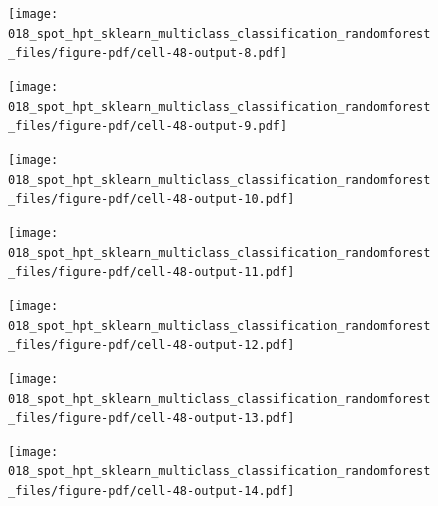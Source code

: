 \documentclass[
  letterpaper,
  DIV=11,
  numbers=noendperiod]{scrreprt}
\begin{document}
\begin{figure}[H]

{\centering \texttt{[image: 018\_spot\_hpt\_sklearn\_multiclass\_classification\_randomforest\_files/figure-pdf/cell-48-output-8.pdf]}

}

\end{figure}

\begin{figure}[H]

{\centering \texttt{[image: 018\_spot\_hpt\_sklearn\_multiclass\_classification\_randomforest\_files/figure-pdf/cell-48-output-9.pdf]}

}

\end{figure}

\begin{figure}[H]

{\centering \texttt{[image: 018\_spot\_hpt\_sklearn\_multiclass\_classification\_randomforest\_files/figure-pdf/cell-48-output-10.pdf]}

}

\end{figure}

\begin{figure}[H]

{\centering \texttt{[image: 018\_spot\_hpt\_sklearn\_multiclass\_classification\_randomforest\_files/figure-pdf/cell-48-output-11.pdf]}

}

\end{figure}

\begin{figure}[H]

{\centering \texttt{[image: 018\_spot\_hpt\_sklearn\_multiclass\_classification\_randomforest\_files/figure-pdf/cell-48-output-12.pdf]}

}

\end{figure}

\begin{figure}[H]

{\centering \texttt{[image: 018\_spot\_hpt\_sklearn\_multiclass\_classification\_randomforest\_files/figure-pdf/cell-48-output-13.pdf]}

}

\end{figure}

\begin{figure}[H]

{\centering \texttt{[image: 018\_spot\_hpt\_sklearn\_multiclass\_classification\_randomforest\_files/figure-pdf/cell-48-output-14.pdf]}

}

\end{figure}
\end{document}
